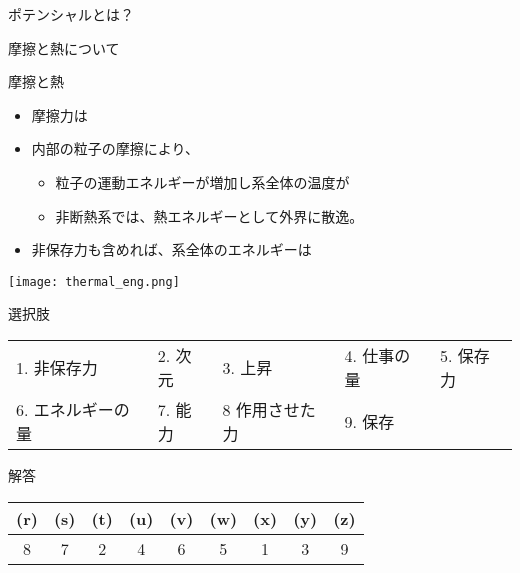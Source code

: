 \documentclass[uplatex,dvipdfmx,a4paper,11pt]{jsarticle}
\begin{document}
\begin{qlist}
\begin{qlist2}
\begin{itembox}[l]{ポテンシャルとは？}
				\end{itembox}
			\qitem 摩擦と熱について
			\begin{center}
				\begin{minipage}{0.5\textwidth}
					\begin{itembox}[l]{摩擦と熱}
						\begin{itemize}
							\item 摩擦力は\qbox{}
							\item 内部の粒子の摩擦により、
								\begin{itemize}
									\item 粒子の運動エネルギーが増加し系全体の温度が\qbox{}
									\item 非断熱系では、熱エネルギーとして外界に散逸。
								\end{itemize}
							\item 非保存力も含めれば、系全体のエネルギーは\qbox{}
						\end{itemize}
					\end{itembox}
				\end{minipage}
				\begin{minipage}{0.34\textwidth}
					\begin{center}
					\texttt{[image: thermal\_eng.png]}
					\end{center}
				\end{minipage}
			\end{center}
		\end{qlist2}
	\begin{itembox}[l]{選択肢}
		\begin{center}
			\begin{tabular}{lllll}
				1. 非保存力	&2. 次元	&3. 上昇	&4. 仕事の量 &5. 保存力\\
				6. エネルギーの量	&7. 能力	&8 作用させた力 &9. 保存
			\end{tabular}
		\end{center}
	\end{itembox}
\end{qlist}

\begin{itembox}[l]{解答}
    \begin{center} 
      \begin{tabular}{|c|c|c|c|c|c|c|c|c|} \hline
        (r) & (s) & (t) & (u) & (v) & (w) & (x) & (y) & (z) \\ \hline
        8 & 7 & 2 & 4 & 6 & 5 & 1 & 3 & 9 \\ \hline		
      \end{tabular}
    \end{center}
\end{itembox}
\end{document}
